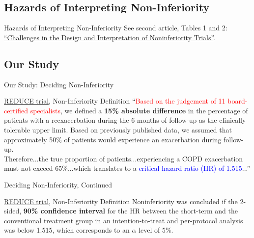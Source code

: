 \documentclass{beamer}
\newcommand{\pro}{\textcolor{blue}}
\newcommand{\con}{\textcolor{red}}
\newcommand{\reduce}{\href{https://doi.org/10.1001/jama.2013.5023}{REDUCE trial}}
\newcommand{\nonInf}{\href{https://doi.org/10.1056/NEJMra1510063}{``Challenges in the Design and Interpretation of Noninferiority Trials''}}
\begin{document}
	\subsection{Hazards of Interpreting Non-Inferiority}
		\begin{frame}{Hazards of Interpreting Non-Inferiority}
			See second article, Tables 1 and 2: \\
			\nonInf.
		\end{frame}
	\subsection{Our Study}
		\begin{frame}{Our Study: Deciding Non-Inferiority}
			\begin{alertblock}{\reduce, Non-Inferiority Definition}
				``\con{Based on the judgement of 11 board-certified specialists}, we defined a \textbf{15\% absolute difference} in the percentage of patients with a reexacerbation during the 6 months of follow-up as the clinically tolerable upper limit. Based on previously published data, we assumed that approximately 50\% of patients would experience an exacerbation during follow-up.
				\\
				Therefore...the true proportion of patients...experiencing a COPD exacerbation must not exceed 65\%...which translates to a \pro{critical hazard ratio (HR) of 1.515}...''
			\end{alertblock}
		\end{frame}
		\begin{frame}{Deciding Non-Inferiority, Continued}
			\begin{alertblock}{\reduce,  Non-Inferiority Definition}
				Noninferiority was concluded if the 2-sided, \textbf{90\% confidence interval} for the HR between the short-term and the conventional treatment group in an intention-to-treat and per-protocol analysis was below 1.515, which corresponds to an $\alpha$ level of 5\%.
			\end{alertblock}
		\end{frame}
\end{document}
